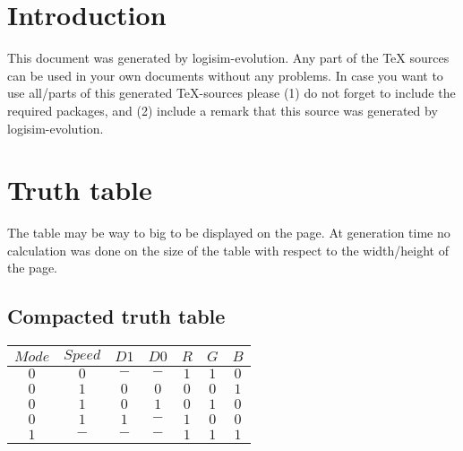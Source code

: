 \documentclass [15pt,a4paper,twoside]{article}
\begin{document}
\section{Introduction}
This document was generated by logisim-evolution. Any part of the TeX sources can be used in your own documents without any problems. In case you want to use all/parts of this generated TeX-sources please (1) do not forget to include the required packages, and (2) include a remark that this source was generated by logisim-evolution.
\section{Truth table}
The table may be way to big to be displayed on the page. At generation time no calculation was done on the size of the table with respect to the width/height of the page.
\subsection{Compacted truth table}
\begin{center}
\begin{tabular}{cccc|ccc}
$Mode$&$Speed$&$D1$&$D0$&$R$&$G$&$B$\\
\hline
$0$&$0$&$-$&$-$&$1$&$1$&$0$\\
$0$&$1$&$0$&$0$&$0$&$0$&$1$\\
$0$&$1$&$0$&$1$&$0$&$1$&$0$\\
$0$&$1$&$1$&$-$&$1$&$0$&$0$\\
$1$&$-$&$-$&$-$&$1$&$1$&$1$\\

\end{tabular}
\end{center}
\end{document}
